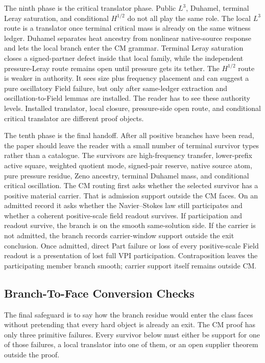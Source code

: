 The ninth phase is the critical translator phase.
Public \(L^3\), Duhamel, terminal Leray saturation, and conditional
\(H^{1/2}\) do not all play the same role.
The local \(L^3\) route is a translator once terminal critical mass is already
on the same witness ledger.
Duhamel separates heat ancestry from nonlinear native-source response and lets
the local branch enter the CM grammar.
Terminal Leray saturation closes a signed-partner defect inside that local
family, while the independent pressure-Leray route remains open until pressure
gets its tether.
The \(H^{1/2}\) route is weaker in authority.
It sees size plus frequency placement and can suggest a pure oscillatory Field
failure, but only after same-ledger extraction and oscillation-to-Field lemmas
are installed.
The reader has to see these authority levels.
Installed translator, local closure, pressure-side open route, and conditional
critical translator are different proof objects.

The tenth phase is the final handoff.
After all positive branches have been read, the paper should leave the reader
with a small number of terminal survivor types rather than a catalogue.
The survivors are high-frequency transfer, lower-prefix active square,
weighted quotient mode, signed-pair reserve, native source atom, pure pressure
residue, Zeno ancestry, terminal Duhamel mass, and conditional critical
oscillation.
The CM routing first asks whether the selected survivor has a positive material
carrier.  That is admission support outside the CM faces.  On an admitted
record it asks whether the Navier--Stokes law still participates and whether a
coherent positive-scale field readout survives.  If participation and readout
survive, the branch is on the smooth same-solution side.
If the carrier is not admitted, the branch records carrier-window support
outside the exit conclusion.  Once admitted, direct Part failure or loss of
every positive-scale Field readout is a presentation of lost full VPI
participation.  Contraposition leaves the participating member branch smooth;
carrier support itself remains outside CM.

\subsection{Branch-To-Face Conversion Checks}

The final safeguard is to say how the branch residue would enter the class
faces without pretending that every hard object is already an exit.
The CM proof has only three primitive failures.
Every survivor below must either be support for one of those failures, a local
translator into one of them, or an open supplier theorem outside the proof.

